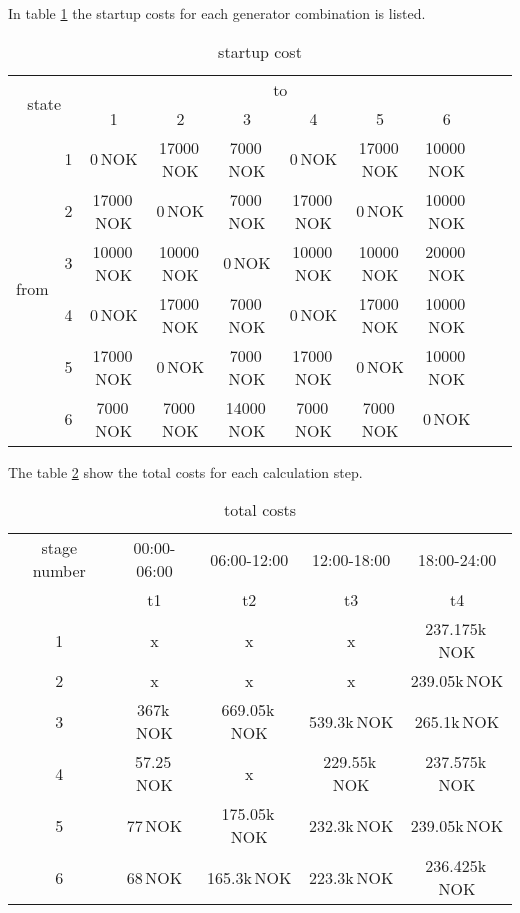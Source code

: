 \documentclass{article}
\begin{document}
In table \ref{tab:startcost} the startup costs for each generator combination is listed.
	\begin{table}[hbt!]
\begin{center}
\begin{tabular}[h]{|c|c||c|c|c|c|c|c|c|c|}
\hline 
\multicolumn{2}{|c|}{\multirow{2}{*}{state}}&\multicolumn{6}{|c|}{to}\\
		\cline{3-8}
    \multicolumn{2}{|c|}{}&1 & 2 & 3 & 4 & 5 & 6 \\
\hline
\hline
\multirow{6}{*}{from}
	& 1 & 0\,NOK 		& 17000\,NOK 	& 7000\,NOK 	& 0\,NOK 		& 17000\,NOK 		& 10000\,NOK\\
	\cline{3-8}
	& 2 & 17000\,NOK 	& 0\,NOK 		& 7000\,NOK 	& 17000\,NOK 	& 0\,NOK 			& 10000\,NOK\\
	\cline{3-8}
	& 3 & 10000\,NOK 	& 10000\,NOK 	& 0\,NOK 		& 10000\,NOK 	& 10000\,NOK 		& 20000\,NOK\\
	\cline{3-8}
	& 4 & 0\,NOK 		& 17000\,NOK 	& 7000\,NOK 	& 0\,NOK 		& 17000\,NOK 		& 10000\,NOK\\
	\cline{3-8}
	& 5 & 17000\,NOK 	& 0\,NOK 		& 7000\,NOK 	& 17000\,NOK 	& 0\,NOK 			& 10000\,NOK\\
	\cline{3-8}
	& 6 & 7000\,NOK 	& 7000\,NOK 	& 14000\,NOK 	& 7000\,NOK 	& 7000\,NOK 		& 0\,NOK\\
\hline
\end{tabular}
\caption{startup cost}\label{tab:startcost}
\end{center}
\end{table}
The table \ref{tab:totcost} show the total costs for each calculation step.
	\begin{table}[hbt!]
\begin{center}
\begin{tabular}[h]{|c||c|c|c|c|}
\hline 
stage number  						&				00:00-06:00		&	06:00-12:00		&		12:00-18:00		&		18:00-24:00\\
\cline{2-5}
									&					t1			&		t2			&			t3			&			t4		\\
\hline
\hline
1 				&				x				&	x				&		x				&		237.175k\,NOK\\
\hline
2  				&				x				&	x				&		x				&		239.05k\,NOK\\
\hline	
3  				&				367k\,NOK 	& 	669.05k\,NOK 	& 		539.3k\,NOK 	& 		265.1k\,NOK\\
\hline
4 	 			&				57.25\,NOK		&	x				&		229.55k\,NOK		&		237.575k\,NOK\\
\hline
5 	 			&				77\,NOK		&	175.05k\,NOK		&		232.3k\,NOK		&		239.05k\,NOK\\
\hline
6 	 			&				68\,NOK		&	165.3k\,NOK		&		223.3k\,NOK		&		236.425k\,NOK\\
\hline
\end{tabular}
\caption{total costs}\label{tab:totcost}
\end{center}
\end{table}
\end{document}
